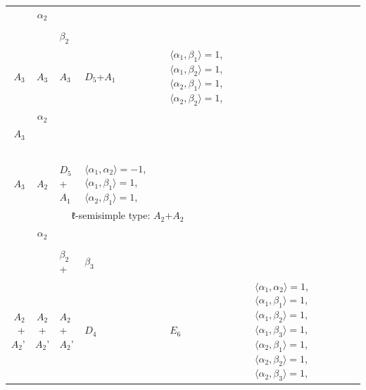 \documentclass[12pt]{report}
\begin{document}
\begin{appendix}
{\begin{longtable}{rcl p{1cm}p{1cm}p{3cm} }
\\
\begin{tabular}{cc}$\alpha_1$+ & $\alpha_2$\\\tiny{  } & \tiny{  }\end{tabular} &\begin{tabular}{c} = \\~ \end{tabular} & \begin{tabular}{cc}$\beta_1$+ & $\beta_2$\\\tiny{ $A_3$ } & \tiny{ $A_3$ }\end{tabular} & $A_3$ & $D_5$+$A_1$ &  $\langle\alpha_1, \beta_1\rangle=1$, $\langle\alpha_1, \beta_2\rangle=1$, $\langle\alpha_2, \beta_1\rangle=1$, $\langle\alpha_2, \beta_2\rangle=1$, 
\\
\begin{tabular}{cc}$\alpha_1$+ & $\alpha_2$\\\tiny{ $A_3$ } & \tiny{  }\end{tabular} &\begin{tabular}{c} = \\~ \end{tabular} & \begin{tabular}{c}$\beta_1$\\\tiny{ $A_3$ }\end{tabular} & $A_2$ & $D_5$+$A_1$ & $\langle\alpha_1, \alpha_2\rangle=-1$,  $\langle\alpha_1, \beta_1\rangle=1$, $\langle\alpha_2, \beta_1\rangle=1$, 
\\
\hline\multicolumn{5}{c}{$\mathfrak{k}$-semisimple type: $A_2$+$A_2$}\\
\hline\hline\begin{tabular}{cc}$\alpha_1$+ & $\alpha_2$\\\tiny{  } & \tiny{  }\end{tabular} &\begin{tabular}{c} = \\~ \end{tabular} & \begin{tabular}{ccc}$\beta_1$+ & $\beta_2$+ & $\beta_3$\\\tiny{ $A_2$+$A_2$' } & \tiny{ $A_2$+$A_2$' } & \tiny{ $A_2$+$A_2$' }\end{tabular} & $D_4$ & $E_6$ & $\langle\alpha_1, \alpha_2\rangle=1$,  $\langle\alpha_1, \beta_1\rangle=1$, $\langle\alpha_1, \beta_2\rangle=1$, $\langle\alpha_1, \beta_3\rangle=1$, $\langle\alpha_2, \beta_1\rangle=1$, $\langle\alpha_2, \beta_2\rangle=1$, $\langle\alpha_2, \beta_3\rangle=1$, 
\\

\end{longtable}}
\end{appendix}
\end{document}

